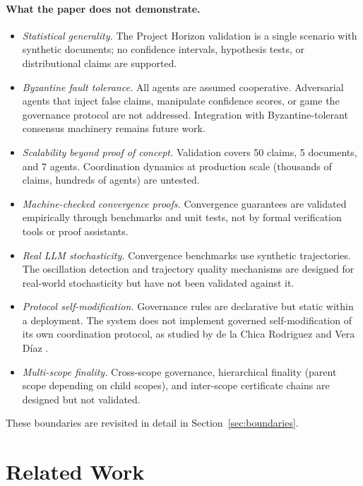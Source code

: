 \documentclass[11pt]{article}
\begin{document}
\paragraph{What the paper does not demonstrate.}
\begin{itemize}
  \item \emph{Statistical generality.} The Project Horizon validation is a single scenario with synthetic documents; no confidence intervals, hypothesis tests, or distributional claims are supported.
  \item \emph{Byzantine fault tolerance.} All agents are assumed cooperative. Adversarial agents that inject false claims, manipulate confidence scores, or game the governance protocol are not addressed. Integration with Byzantine-tolerant consensus machinery \cite{lamport1982,castro1999} remains future work.
  \item \emph{Scalability beyond proof of concept.} Validation covers 50 claims, 5 documents, and 7 agents. Coordination dynamics at production scale (thousands of claims, hundreds of agents) are untested.
  \item \emph{Machine-checked convergence proofs.} Convergence guarantees are validated empirically through benchmarks and unit tests, not by formal verification tools or proof assistants.
  \item \emph{Real LLM stochasticity.} Convergence benchmarks use synthetic trajectories. The oscillation detection and trajectory quality mechanisms are designed for real-world stochasticity but have not been validated against it.
  \item \emph{Protocol self-modification.} Governance rules are declarative but static within a deployment. The system does not implement governed self-modification of its own coordination protocol, as studied by de la Chica Rodriguez and Vera D\'{i}az \cite{delachica2026}.
  \item \emph{Multi-scope finality.} Cross-scope governance, hierarchical finality (parent scope depending on child scopes), and inter-scope certificate chains are designed but not validated.
\end{itemize}

These boundaries are revisited in detail in Section~\ref{sec:boundaries}.

\section{Related Work}
\end{document}
